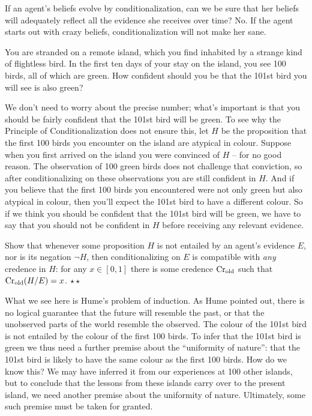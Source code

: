 If an agent's beliefs evolve by conditionalization, can we be sure
that her beliefs will adequately reflect all the evidence she receives
over time? No. If the agent starts out with crazy beliefs,
conditionalization will not make her sane.

\begin{example}\label{ex:grue}
  You are stranded on a remote island, which you find inhabited by a
  strange kind of flightless bird. In the first ten days of your stay
  on the island, you see 100 birds, all of which are green. How
  confident should you be that the 101st bird you will see is also
  green?
\end{example}

We don't need to worry about the precise number; what's important is
that you should be fairly confident that the 101st bird will be
green. To see why the Principle of Conditionalization does not ensure
this, let $H$ be the proposition that the first 100 birds you
encounter on the island are atypical in colour. Suppose when you first
arrived on the island you were convinced of $H$ -- for no good
reason. The observation of 100 green birds does not challenge that
conviction, so after conditionalizing on these observations you are
still confident in $H$. And if you believe that the first 100 birds
you encountered were not only green but also atypical in colour, then
you'll expect the 101st bird to have a different colour. So if we
think you should be confident that the 101st bird will be green, we
have to say that you should not be confident in $H$ before receiving
any relevant evidence.


\begin{exercise}
  Show that whenever some proposition $H$ is not entailed by an
  agent's evidence $E$, nor is its negation $\neg H$, then
  conditionalizing on $E$ is compatible with \emph{any} credence in $H$:
  for any $x \in [0,1]$ there is some credence $\text{Cr}_\text{old}$ such
  that $\text{Cr}_\text{old}(H/E) = x$. $\star\star$
\end{exercise}

What we see here is Hume's problem of induction. As Hume pointed out,
there is no logical guarantee that the future will resemble the past,
or that the unobserved parts of the world resemble the
observed. The colour of the 101st bird is not entailed by the colour
of the first 100 birds. To infer that the 101st bird is green we thus
need a further premise about the ``uniformity of nature'': that the
101st bird is likely to have the same colour as the first 100
birds. How do we know this? We may have inferred it from our
experiences at 100 other islands, but to conclude that the lessons
from these islands carry over to the present island, we need another
premise about the uniformity of nature. Ultimately, some such premise
must be taken for granted.

